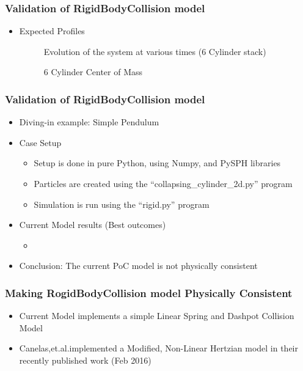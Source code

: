 \documentclass{beamer}
\begin{document}
 \begin{frame} %
  \frametitle{Validation of RigidBodyCollision model} 
  	\begin{itemize}
  	 \item Expected Profiles
  	  \begin{figure}
 	   \centering{}
 	   \caption{Evolution of the system at various times (6 Cylinder stack)}
 	   \end{figure}
 	  \begin{figure}
 	   \centering{}
 	   \caption{6 Cylinder Center of Mass}
 	  \end{figure}
    \end{itemize}
  \end{frame}
 
 \begin{frame} %
  \frametitle{Validation of RigidBodyCollision model} %
  	\begin{itemize}
  	 \item Diving-in example: Simple Pendulum \pause
  	 \item Case Setup
  	 	\begin{itemize}
  	 	 \item Setup is done in pure Python, using Numpy, and PySPH libraries 
  	 	 \item Particles are created using the ``collapsing\_cylinder\_2d.py'' program
  	 	 \item Simulation is run using the ``rigid.py'' program
  	 	\end{itemize}\pause
  	 \item Current Model results (Best outcomes)
  	 \begin{itemize}
  	  \item 
  	 \end{itemize} \pause
  	 \item Conclusion: The current PoC model is not physically consistent
    \end{itemize}
 \end{frame}
  
 \begin{frame} %
  \frametitle{Making RogidBodyCollision model Physically Consistent}
  \begin{itemize}
   \item Current Model implements a simple Linear Spring and Dashpot Collision Model \pause
   \item Canelas,et.al.\footnotemark  implemented a Modified, Non-Linear Hertzian model in their recently published work (Feb 2016)
  \end{itemize}
 \end{frame}
 
\end{document}
